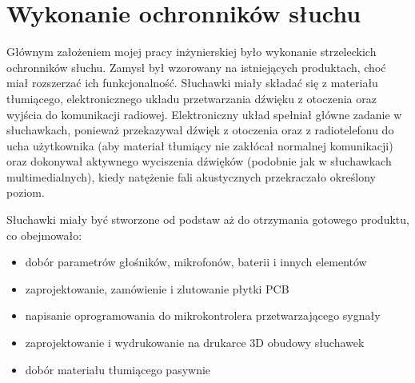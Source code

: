 \chapter{Wykonanie ochronników słuchu}

Głównym założeniem mojej pracy inżynierskiej było wykonanie strzeleckich ochronników słuchu. Zamysł był wzorowany na istniejących produktach, choć miał rozszerzać ich funkcjonalność. Słuchawki miały składać się z materiału tłumiącego, elektronicznego układu przetwarzania dźwięku z otoczenia oraz wyjścia do komunikacji radiowej. Elektroniczny układ spełniał główne zadanie w słuchawkach, ponieważ przekazywał dźwięk z otoczenia oraz z radiotelefonu do ucha użytkownika (aby materiał tłumiący nie zakłócał normalnej komunikacji) oraz dokonywał aktywnego wyciszenia dźwięków (podobnie jak w słuchawkach multimedialnych), kiedy natężenie fali akustycznych przekraczało określony poziom.

Słuchawki miały być stworzone od podstaw aż do otrzymania gotowego produktu, co obejmowało:

\begin{itemize}
    \item dobór parametrów głośników, mikrofonów, baterii i innych elementów
    \item zaprojektowanie, zamówienie i zlutowanie płytki PCB
    \item napisanie oprogramowania do mikrokontrolera przetwarzającego sygnały
    \item zaprojektowanie i wydrukowanie na drukarce 3D obudowy słuchawek
    \item dobór materiału tłumiącego pasywnie
\end{itemize}
